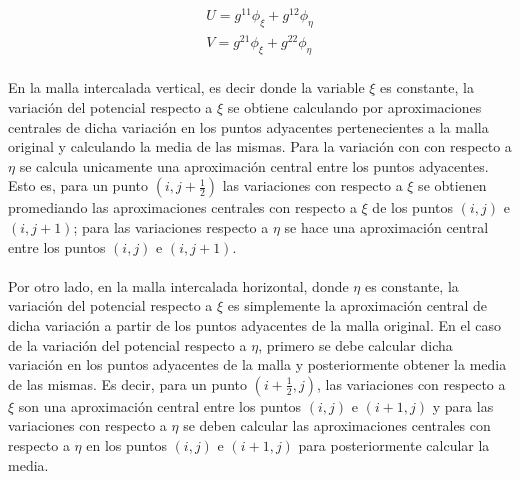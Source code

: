 \documentclass[letterpaper, openright, 12pt]{book}
\begin{document}
        \begin{align*}
            U = g^{11} \phi_{\xi} + g^{12} \phi_{\eta}
            \\
            V = g^{21} \phi_{\xi} + g^{22} \phi_{\eta}
        \end{align*}

    \paragraph*{}
        En la malla intercalada vertical, es decir donde la variable $\xi$ es
        constante, la variación del potencial respecto a $\xi$ se obtiene
        calculando por aproximaciones centrales de dicha variación en los puntos
        adyacentes pertenecientes a la malla original y calculando la media de
        las mismas. Para la variación con con respecto a $\eta$ se calcula
        unicamente una aproximación central entre los puntos adyacentes. Esto
        es, para un punto $(i, j + \frac{1}{2})$ las variaciones con respecto a
        $\xi$ se obtienen promediando las aproximaciones centrales con respecto
        a $\xi$ de los puntos $(i, j)$ e $(i, j+1)$; para las variaciones
        respecto a $\eta$ se hace una aproximación central entre los puntos
        $(i, j)$ e $(i, j+1)$.

    \paragraph*{}
        Por otro lado, en la malla intercalada horizontal, donde $\eta$ es 
        constante, la variación del potencial respecto a $\xi$ es simplemente
        la aproximación central de dicha variación a partir de los puntos
        adyacentes de la malla original. En el caso de la variación del
        potencial respecto a $\eta$, primero se debe calcular dicha variación
        en los puntos adyacentes de la malla y posteriormente obtener la media
        de las mismas. Es decir, para un punto $(i + \frac{1}{2}, j)$, las
        variaciones con respecto a $\xi$ son una aproximación central entre los
        puntos $(i, j)$ e $(i + 1, j)$ y para las variaciones con respecto a
        $\eta$ se deben calcular las aproximaciones centrales con respecto a
        $\eta$ en los puntos $(i, j)$ e $(i + 1, j)$ para posteriormente
        calcular la media.
\end{document}
